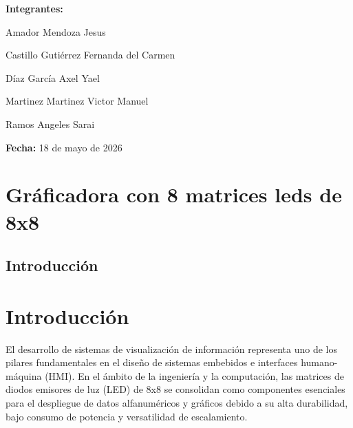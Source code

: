 \begin{titlepage}
\begin{flushleft}
        \hspace{1.5cm} \large \textbf{Integrantes:} \par
        \vspace{0.3cm}
        \hspace{1.5cm} \large Amador Mendoza Jesus \par
        \hspace{1.5cm} \large Castillo Gutiérrez Fernanda del Carmen \par
        \hspace{1.5cm} \large Díaz García Axel Yael \par           \hspace{1.5cm} \large Martinez Martinez Victor Manuel \par
        \hspace{1.5cm} \large Ramos Angeles Sarai \par
    \end{flushleft}
    
    \vfill %
    
    {\large \textbf{Fecha:} 18 de mayo de 2026 \par}

\end{titlepage}

\clearpage

\section*{Gráficadora con 8 matrices leds de 8x8}
\subsection*{Introducción}

\section{Introducción}

El desarrollo de sistemas de visualización de información representa uno de los pilares fundamentales en el diseño de sistemas embebidos e interfaces humano-máquina (HMI). En el ámbito de la ingeniería y la computación, las matrices de diodos emisores de luz (LED) de 8x8 se consolidan como componentes esenciales para el despliegue de datos alfanuméricos y gráficos debido a su alta durabilidad, bajo consumo de potencia y versatilidad de escalamiento. 

